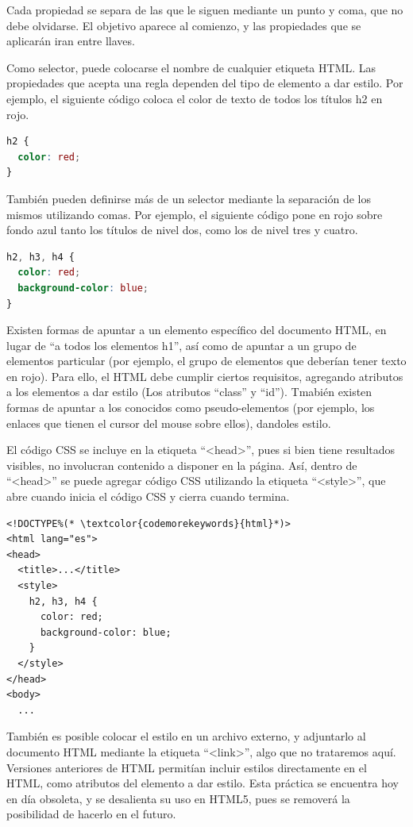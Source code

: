Cada propiedad se separa de las que le siguen mediante un punto y coma, que no
debe olvidarse. El objetivo aparece al comienzo, y las propiedades que se
aplicarán iran entre llaves.

Como selector, puede colocarse el nombre de cualquier etiqueta HTML. Las
propiedades que acepta una regla dependen del tipo de elemento a dar estilo.
Por ejemplo, el siguiente código coloca el color de texto de todos los títulos
h2 en rojo.

\begin{lstlisting}[language=CSS]
h2 {
  color: red;
}
\end{lstlisting}

También pueden definirse más de un selector mediante la separación de los mismos
utilizando comas. Por ejemplo, el siguiente código pone en rojo sobre fondo
azul tanto los títulos de nivel dos, como los de nivel tres y cuatro.

\begin{lstlisting}[language=CSS]
h2, h3, h4 {
  color: red;
  background-color: blue;
}
\end{lstlisting}

Existen formas de apuntar a un elemento específico del documento HTML, en lugar
de ``a todos los elementos h1'', así como de apuntar a un grupo de elementos
particular (por ejemplo, el grupo de elementos que deberían tener texto en rojo).
Para ello, el HTML debe cumplir ciertos requisitos, agregando atributos a los
elementos a dar estilo (Los atributos ``class'' y ``id''). Tmabién existen
formas de apuntar a los conocidos como pseudo-elementos (por ejemplo, los
enlaces que tienen el cursor del mouse sobre ellos), dandoles estilo.

El código CSS se incluye en la etiqueta ``<head>'', pues si bien tiene resultados
visibles, no involucran contenido a disponer en la página. Así, dentro de ``<head>''
se puede agregar código CSS utilizando la etiqueta ``<style>'', que abre cuando
inicia el código CSS y cierra cuando termina.

\begin{lstlisting}[language=XHTML]
<!DOCTYPE%(* \textcolor{codemorekeywords}{html}*)>
<html lang="es">
<head>
  <title>...</title>
  <style>
    h2, h3, h4 {
      color: red;
      background-color: blue;
    }
  </style>
</head>
<body>
  ...
\end{lstlisting}

También es posible colocar el estilo en un archivo externo, y adjuntarlo al
documento HTML mediante la etiqueta ``<link>'', algo que no trataremos aquí.
Versiones anteriores de HTML permitían incluir estilos directamente en el
HTML, como atributos del elemento a dar estilo. Esta práctica se encuentra
hoy en día obsoleta, y se desalienta su uso en HTML5, pues se removerá la
posibilidad de hacerlo en el futuro.

